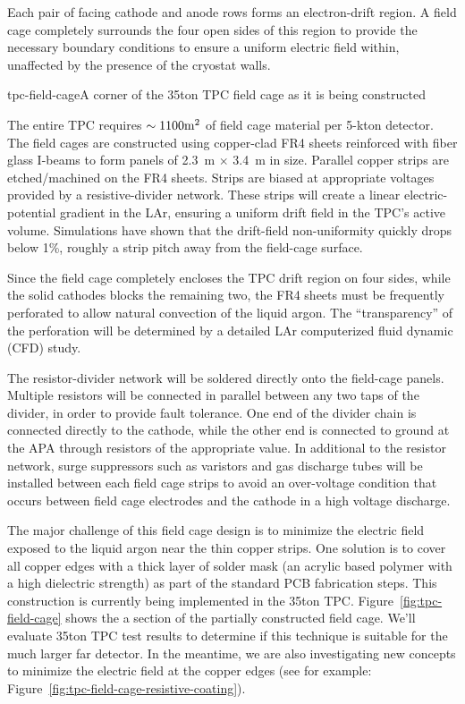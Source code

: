 Each pair of facing cathode and anode rows forms an electron-drift region. A field cage  completely surrounds the four open sides of this region
to provide the necessary boundary conditions to ensure a uniform electric field within, unaffected by the presence of the cryostat walls.


\begin{cdrfigure}{tpc-field-cage}{A corner of the 35ton TPC field cage as it is being constructed}
\end{cdrfigure}


The entire TPC requires $\sim 1100 \rm{m}^2$ of field 
cage material per 5-kton detector. The field cages are constructed using copper-clad FR4 sheets reinforced with fiber glass I-beams to form panels of 2.3~m $\times$ 3.4~m in size. Parallel copper strips are etched/machined
on the FR4 sheets. Strips are 
biased at appropriate voltages provided by a resistive-divider network. These strips will create
a linear electric-potential gradient in the LAr, ensuring a uniform drift 
field in the TPC's active volume.  Simulations have shown that the drift-field non-uniformity quickly drops below 1\%, roughly 
a strip pitch away from the field-cage surface. 

Since the field cage completely encloses the TPC drift region on four sides, while the solid cathodes blocks the remaining two, the FR4 sheets must 
be frequently perforated to allow natural convection of the liquid argon.  
The ``transparency'' of the perforation will be determined by a 
detailed LAr computerized fluid dynamic (CFD) study.


The resistor-divider network will be soldered directly onto the field-cage panels. 
Multiple resistors will be connected in parallel between any two taps of the divider,
in order to provide fault tolerance. 
One end of the divider chain is connected directly to the cathode, while the other end is connected to ground at the APA through resistors of the appropriate value. 
In additional to the resistor network, surge suppressors such as varistors and gas discharge tubes will be installed between each field cage strips to avoid an over-voltage condition that occurs between field cage electrodes and the cathode in a high voltage discharge.


The major challenge of this field cage design is to minimize the electric field exposed to the liquid argon near the thin copper strips.  One solution is to cover all copper edges with a thick layer of solder mask (an acrylic based polymer with a high dielectric strength) as part of the standard PCB fabrication steps.  This construction is currently being implemented in the 35ton TPC.  Figure~\ref{fig:tpc-field-cage} shows 
the a section of the partially constructed field cage.  We'll evaluate 35ton TPC test results to determine if this technique is suitable for the much larger far detector.  In the meantime, we are also investigating new concepts to minimize the electric field at the copper edges (see for example: Figure~\ref{fig:tpc-field-cage-resistive-coating}).

